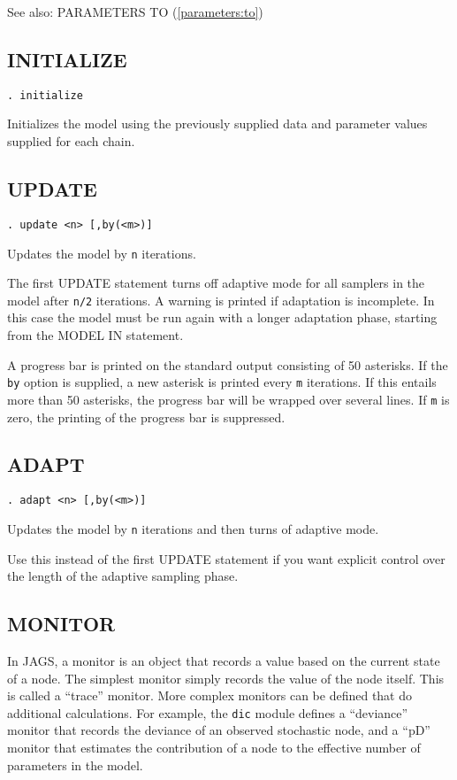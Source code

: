 \documentclass[11pt, a4paper, titlepage]{report}
\newcommand{\JAGS}{\textsf{JAGS}}
\begin{document}
See also: PARAMETERS TO (\ref{parameters:to})

\subsection{INITIALIZE}

\begin{verbatim}
. initialize
\end{verbatim}
Initializes the model using the previously supplied data and parameter
values supplied for each chain.

\subsection{UPDATE}

\begin{verbatim}
. update <n> [,by(<m>)]
\end{verbatim}
Updates the model by \texttt{n} iterations. 

The first UPDATE statement turns off adaptive mode for all samplers in
the model after \texttt{n/2} iterations. A warning is printed 
if adaptation is incomplete. In this case the model must be run again
with a longer adaptation phase, starting from the MODEL IN statement.

A progress bar is printed on the standard output consisting of 50
asterisks. If the \texttt{by} option is supplied, a new asterisk is
printed every \texttt{m} iterations. If this entails more than 50
asterisks, the progress bar will be wrapped over several lines.  If
\texttt{m} is zero, the printing of the progress bar is suppressed.

\subsection{ADAPT}

\begin{verbatim}
. adapt <n> [,by(<m>)]
\end{verbatim}
Updates the model by \texttt{n} iterations and then turns of
adaptive mode.

Use this instead of the first UPDATE statement if you want explicit
control over the length of the adaptive sampling phase.

\subsection{MONITOR}
\label{section:monitor}

In \JAGS, a monitor is an object that records a value based on the
current state of a node.  The simplest monitor simply records the
value of the node itself. This is called a ``trace'' monitor. More
complex monitors can be defined that do additional calculations.  For
example, the \verb+dic+ module defines a ``deviance'' monitor that
records the deviance of an observed stochastic node, and a ``pD''
monitor that estimates the contribution of a node to the effective
number of parameters in the model.
\end{document}
